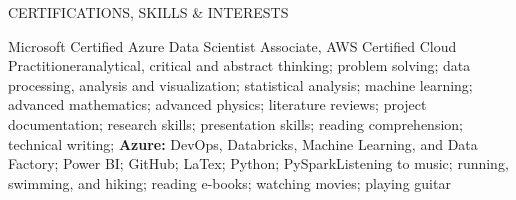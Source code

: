 \documentclass{resume}
\begin{document}
\begin{Section}{CERTIFICATIONS, SKILLS \& INTERESTS}

\begin{csiSection}{Microsoft Certified Azure Data Scientist Associate, AWS Certified Cloud Practitioner}{analytical, critical and abstract thinking; problem solving; data processing, analysis and visualization; statistical analysis; machine learning; advanced mathematics; advanced physics; literature reviews; project documentation; research skills; presentation skills; reading comprehension; technical writing; \textbf{Azure:} DevOps, Databricks, Machine Learning, and Data Factory; Power BI; GitHub; LaTex; Python; PySpark}{Listening to music; running, swimming, and hiking; reading e-books; watching movies; playing guitar}
\end{csiSection}

\end{Section}


\hfil {} \hfil


\end{document}
